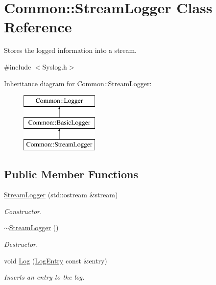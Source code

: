 \hypertarget{class_common_1_1_stream_logger}{\section{Common\-:\-:Stream\-Logger Class Reference}
\label{class_common_1_1_stream_logger}
}


Stores the logged information into a stream.  




{\ttfamily \#include $<$Syslog.\-h$>$}

Inheritance diagram for Common\-:\-:Stream\-Logger\-:\begin{figure}[H]
\begin{center}
\leavevmode
\includegraphics[height=3.000000cm]{class_common_1_1_stream_logger}
\end{center}
\end{figure}
\subsection*{Public Member Functions}
\begin{DoxyCompactItemize}
\item 
\hypertarget{class_common_1_1_stream_logger_aeafb578c20b750c1481fd14e822e5cff}{\hyperlink{class_common_1_1_stream_logger_aeafb578c20b750c1481fd14e822e5cff}{Stream\-Logger} (std\-::ostream \&stream)}\label{class_common_1_1_stream_logger_aeafb578c20b750c1481fd14e822e5cff}

\begin{DoxyCompactList}\small\item\em Constructor. \end{DoxyCompactList}\item 
\hypertarget{class_common_1_1_stream_logger_aa3df29ce6de680d87e4dc44f6dd242ae}{\hyperlink{class_common_1_1_stream_logger_aa3df29ce6de680d87e4dc44f6dd242ae}{$\sim$\-Stream\-Logger} ()}\label{class_common_1_1_stream_logger_aa3df29ce6de680d87e4dc44f6dd242ae}

\begin{DoxyCompactList}\small\item\em Destructor. \end{DoxyCompactList}\item 
\hypertarget{class_common_1_1_stream_logger_ad6176e77665c3d383469d492121d7ece}{void \hyperlink{class_common_1_1_stream_logger_ad6176e77665c3d383469d492121d7ece}{Log} (\hyperlink{class_common_1_1_log_entry}{Log\-Entry} const \&entry)}\label{class_common_1_1_stream_logger_ad6176e77665c3d383469d492121d7ece}

\begin{DoxyCompactList}\small\item\em Inserts an entry to the log. \end{DoxyCompactList}\end{DoxyCompactItemize}
